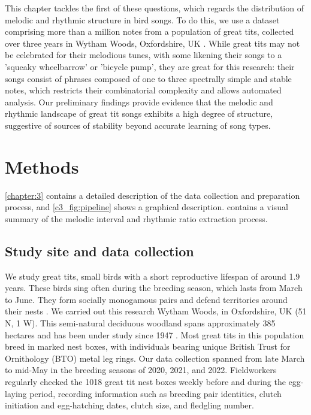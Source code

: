 This chapter tackles the first of these questions, which regards the distribution of melodic and rhythmic structure in bird songs. To do this, we use a dataset comprising more than a million notes from a population of great tits, collected over three years in Wytham Woods, Oxfordshire, UK \autocite{merinorecalde2023a}. While great tits may not be celebrated for their melodious tunes, with some likening their songs to a 'squeaky wheelbarrow' or 'bicycle pump', they are great for this research: their songs consist of phrases composed of one to three spectrally simple and stable notes, which restricts their combinatorial complexity and allows automated analysis. Our preliminary findings provide evidence that the melodic and rhythmic landscape of great tit songs exhibits a high degree of structure, suggestive of sources of stability beyond accurate learning of song types.

\section{Methods}
\label{c5:methods}

\autoref{chapter:3} contains a detailed description of the data collection and preparation process, and \autoref{c3_fig:pipeline} shows a graphical description.  contains a visual summary of the melodic interval and rhythmic ratio extraction process.

\subsection{Study site and data collection}
We study great tits, small birds with a short reproductive lifespan of around 1.9 years. These birds sing often during the breeding season, which lasts from March to June. They form socially monogamous pairs and defend territories around their nests \parencite{hinde1952}. We carried out this research Wytham Woods, in Oxfordshire, UK (51 N, 1 W). This semi-natural deciduous woodland spans approximately 385 hectares and has been under study since 1947 \parencite{lack1964}. Most great tits in this population breed in marked nest boxes, with individuals bearing unique British Trust for Ornithology (BTO) metal leg rings. Our data collection spanned from late March to mid-May in the breeding seasons of 2020, 2021, and 2022. Fieldworkers regularly checked the 1018 great tit nest boxes weekly before and during the egg-laying period, recording information such as breeding pair identities, clutch initiation and egg-hatching dates, clutch size, and fledgling number.

